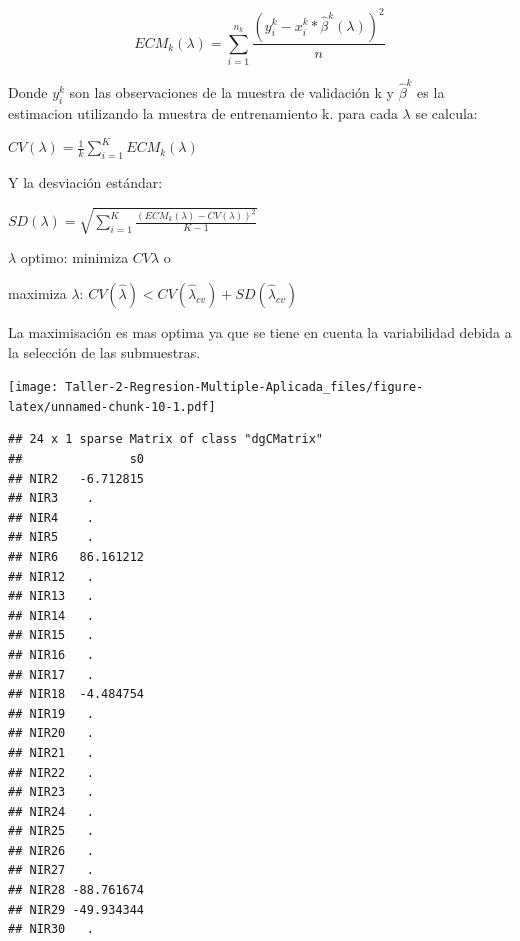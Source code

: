 \documentclass[
]{article}
\newenvironment{Shaded}{\begin{snugshade}}{\end{snugshade}}
\newcommand{\AttributeTok}[1]{\textcolor[rgb]{0.77,0.63,0.00}{#1}}
\newcommand{\DecValTok}[1]{\textcolor[rgb]{0.00,0.00,0.81}{#1}}
\newcommand{\FloatTok}[1]{\textcolor[rgb]{0.00,0.00,0.81}{#1}}
\newcommand{\FunctionTok}[1]{\textcolor[rgb]{0.00,0.00,0.00}{#1}}
\newcommand{\NormalTok}[1]{#1}
\newcommand{\OtherTok}[1]{\textcolor[rgb]{0.56,0.35,0.01}{#1}}
\newcommand{\SpecialCharTok}[1]{\textcolor[rgb]{0.00,0.00,0.00}{#1}}
\begin{document}
\[ECM_k(\lambda)= \sum_{i=1}^{n_k}\frac{(y_i^k- x_i^k*\hat{\beta}^k(\lambda))^2}{n}\]

Donde \(y_i^k\) son las observaciones de la muestra de validación k y
\(\hat{\beta}^k\) es la estimacion utilizando la muestra de
entrenamiento k. para cada \(\lambda\) se calcula:

\(CV(\lambda)=\frac{1}{k}\sum_{i=1}^{K}ECM_k(\lambda)\)

Y la desviación estándar:

\(SD(\lambda)=\sqrt{\sum_{i=1}^{K}\frac{(ECM_k(\lambda)-CV(\lambda))^2}{K-1}}\)

\(\lambda\) optimo: minimiza \(CV{\lambda}\) o

maximiza \(\lambda\):
\(CV(\hat{\lambda}) < CV(\hat{\lambda}_{cv})+SD(\hat{\lambda}_{cv})\)

La maximisación es mas optima ya que se tiene en cuenta la variabilidad
debida a la selección de las submuestras.

\begin{Shaded}
\end{Shaded}

\texttt{[image: Taller-2-Regresion-Multiple-Aplicada\_files/figure-latex/unnamed-chunk-10-1.pdf]}

\begin{Shaded}
\end{Shaded}

\begin{verbatim}
## 24 x 1 sparse Matrix of class "dgCMatrix"
##               s0
## NIR2   -6.712815
## NIR3    .       
## NIR4    .       
## NIR5    .       
## NIR6   86.161212
## NIR12   .       
## NIR13   .       
## NIR14   .       
## NIR15   .       
## NIR16   .       
## NIR17   .       
## NIR18  -4.484754
## NIR19   .       
## NIR20   .       
## NIR21   .       
## NIR22   .       
## NIR23   .       
## NIR24   .       
## NIR25   .       
## NIR26   .       
## NIR27   .       
## NIR28 -88.761674
## NIR29 -49.934344
## NIR30   .
\end{verbatim}
\end{document}
